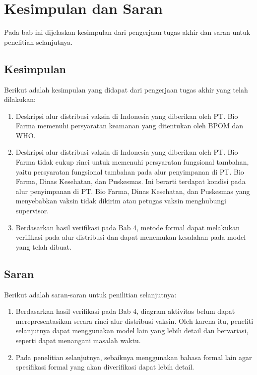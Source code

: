 \chapter{Kesimpulan dan Saran}

Pada bab ini dijelaskan kesimpulan dari pengerjaan tugas akhir dan saran untuk penelitian selanjutnya.

\section{Kesimpulan}

Berikut adalah kesimpulan yang didapat dari pengerjaan tugas akhir yang telah dilakukan:

\begin{enumerate}
	\item Deskripsi alur distribusi vaksin di Indonesia yang diberikan oleh PT. Bio Farma memenuhi persyaratan keamanan yang ditentukan oleh BPOM dan WHO.
	
	\item Deskripsi alur distribusi vaksin di Indonesia yang diberikan oleh PT. Bio Farma tidak cukup rinci untuk memenuhi persyaratan fungsional tambahan, yaitu persyaratan fungsional tambahan pada alur penyimpanan di PT. Bio Farma, Dinas Kesehatan, dan Puskesmas. Ini berarti terdapat kondisi pada alur penyimpanan di PT. Bio Farma, Dinas Kesehatan, dan Puskesmas yang menyebabkan vaksin tidak dikirim atau petugas vaksin menghubungi supervisor.
	
	\item Berdasarkan hasil verifikasi pada Bab 4, metode formal dapat melakukan verifikasi pada alur distribusi dan dapat menemukan kesalahan pada model yang telah dibuat.
	
\end{enumerate}

\section{Saran}

Berikut adalah saran-saran untuk penilitian selanjutnya:

\begin{enumerate}
	\item Berdasarkan hasil verifikasi pada Bab 4, diagram aktivitas belum dapat merepresentasikan secara rinci alur distribusi vaksin. Oleh karena itu, peneliti selanjutnya dapat menggunakan model lain yang lebih detail dan bervariasi, seperti dapat menangani masalah waktu.
	
	\item Pada penelitian selanjutnya, sebaiknya menggunakan bahasa formal lain agar spesifikasi formal yang akan diverifikasi dapat lebih detail.
\end{enumerate}